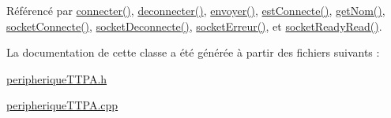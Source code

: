 Référencé par \hyperlink{class_peripherique_t_t_p_a_a8afa92f7c3ae6e1edc30f5c8b386af81}{connecter()}, \hyperlink{class_peripherique_t_t_p_a_a23bd4f409e6763022807d5b278464328}{deconnecter()}, \hyperlink{class_peripherique_t_t_p_a_a529048ac8be73560038bbeee0047b634}{envoyer()}, \hyperlink{class_peripherique_t_t_p_a_a33991b646ef2a49e79bac478b5f722c7}{est\+Connecte()}, \hyperlink{class_peripherique_t_t_p_a_abb04680791a7e778ac3808b5d218421f}{get\+Nom()}, \hyperlink{class_peripherique_t_t_p_a_aab23a43f5c9d70c30df3dbf4aeeeff9d}{socket\+Connecte()}, \hyperlink{class_peripherique_t_t_p_a_adb04c45864ea56a80a0716cde0a31856}{socket\+Deconnecte()}, \hyperlink{class_peripherique_t_t_p_a_a85811ace874ff7cea3437146511f1b2c}{socket\+Erreur()}, et \hyperlink{class_peripherique_t_t_p_a_a4e1d676e59b293161a40ee6428a79871}{socket\+Ready\+Read()}.



La documentation de cette classe a été générée à partir des fichiers suivants \+:\begin{DoxyCompactItemize}
\item 
\hyperlink{peripherique_t_t_p_a_8h}{peripherique\+T\+T\+P\+A.\+h}\item 
\hyperlink{peripherique_t_t_p_a_8cpp}{peripherique\+T\+T\+P\+A.\+cpp}\end{DoxyCompactItemize}

